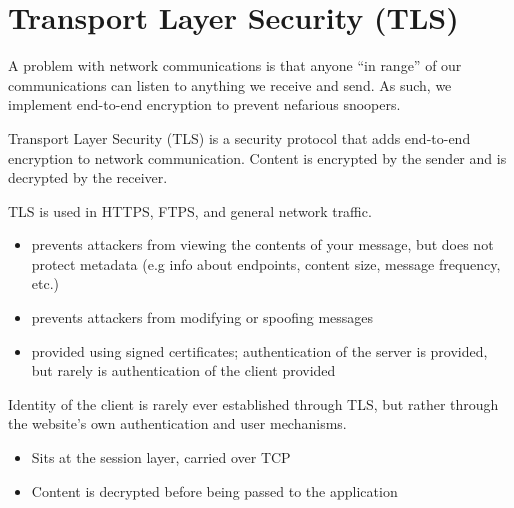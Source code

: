 \section{Transport Layer Security (TLS)}

A problem with network communications is that anyone ``in range'' of our communications can listen to anything we receive and send. As such, we implement end-to-end encryption to prevent nefarious snoopers.

\begin{dfnbox}{Transport Layer Security (TLS)}{}
     is a security protocol that adds end-to-end encryption to network communication. Content is encrypted by the sender and is decrypted by the receiver.
\end{dfnbox}

TLS is used in HTTPS, FTPS, and general network traffic.

\begin{itemize}
    \item {} prevents attackers from viewing the contents of your message, but does not protect metadata (e.g info about endpoints, content size, message frequency, etc.)
    \item {} prevents attackers from modifying or spoofing messages
    \item {} provided using signed certificates; authentication of the server is provided, but rarely is authentication of the client provided
\end{itemize}

Identity of the client is rarely ever established through TLS, but rather through the website's own authentication and user mechanisms.
\begin{itemize}
    \item Sits at the session layer, carried over TCP
    \item Content is decrypted before being passed to the application
\end{itemize}

